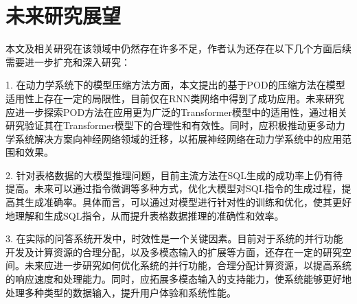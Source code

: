 \section{未来研究展望}
本文及相关研究在该领域中仍然存在许多不足，作者认为还存在以下几个方面后续需要进一步扩充和深入研究：

1.	在动力学系统下的模型压缩方法方面，本文提出的基于POD的压缩方法在模型适用性上存在一定的局限性，目前仅在RNN类网络中得到了成功应用。未来研究应进一步探索POD方法在应用更为广泛的Transformer模型中的适用性，通过相关研究验证其在Transformer模型下的合理性和有效性。同时，应积极推动更多动力学系统解决方案向神经网络领域的迁移，以拓展神经网络在动力学系统中的应用范围和效果。

2.	针对表格数据的大模型推理问题，目前主流方法在SQL生成的成功率上仍有待提高。未来可以通过指令微调等多种方式，优化大模型对SQL指令的生成过程，提高其生成准确率。具体而言，可以通过对模型进行针对性的训练和优化，使其更好地理解和生成SQL指令，从而提升表格数据推理的准确性和效率。

3.	在实际的问答系统开发中，时效性是一个关键因素。目前对于系统的并行功能开发及计算资源的合理分配，以及多模态输入的扩展等方面，还存在一定的研究空间。未来应进一步研究如何优化系统的并行功能，合理分配计算资源，以提高系统的响应速度和处理能力。同时，应拓展多模态输入的支持能力，使系统能够更好地处理多种类型的数据输入，提升用户体验和系统性能。
